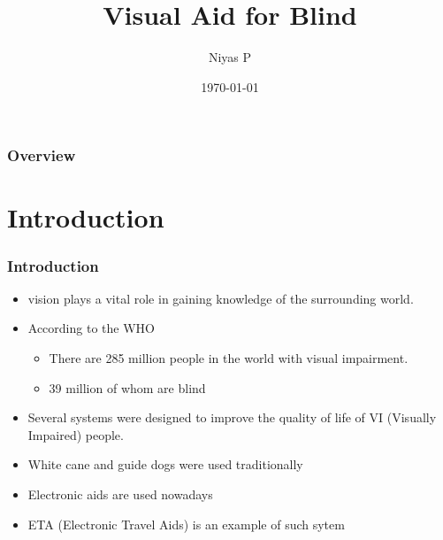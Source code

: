 \documentclass{beamer}
\title[Visual Aid for Blind]{Visual Aid for Blind} %
\author{Niyas P} %
\institute[College of Engineering, Trivandrum] %
{TVE17ECSP10\\M. Tech (Signal Procesing)\\Third Semester\\
\medskip
\textit{https://github.com/niyaspcet/MTechMainProject}\\ %
\vspace{1cm}
\textit{Guide}\\
Dr. Sreelatha G.\\
Department of ECE\\
College of Engineering, Trivandrum


}
\date{\today} %
\begin{document}
\begin{frame}[plain]

\titlepage %
\end{frame}

\begin{frame}
\frametitle{Overview} %
\tableofcontents %
\end{frame}


\section{Introduction} %


\begin{frame}
\frametitle{Introduction}
\begin{itemize}
\item
vision plays a vital role in gaining knowledge of the surrounding
world.
\item
According to the WHO
\begin{itemize}
\item
There are 285 million people in the world with visual
impairment.
\item
39 million of whom are blind
\end{itemize}
\item
Several systems were designed to improve the quality of life of VI (Visually Impaired) people.
\item
White cane and guide dogs were used traditionally
\item
Electronic aids are used nowadays
\item
ETA (Electronic Travel Aids) is an example of such sytem
\end{itemize}
\end{frame}
\end{document}
